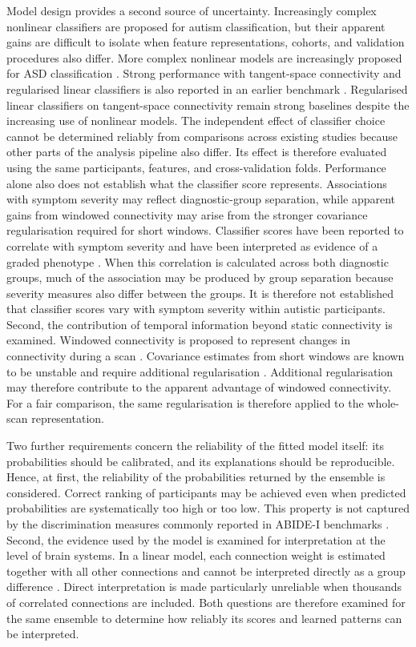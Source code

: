 Model design provides a second source of uncertainty. Increasingly complex nonlinear classifiers are proposed for autism classification, but their apparent gains are difficult to isolate when feature representations, cohorts, and validation procedures also differ. More complex nonlinear models are increasingly proposed for ASD classification \citep{Liuetal2024MADE,Tangetal2025GNNLSTM,Tangetal2026CASGNN}. Strong performance with tangent-space connectivity and regularised linear classifiers is also reported in an earlier benchmark \citep{Dadietal2019}. Regularised linear classifiers on tangent-space connectivity remain strong baselines despite the increasing use of nonlinear models. The independent effect of classifier choice cannot be determined reliably from comparisons across existing studies because other parts of the analysis pipeline also differ. Its effect is therefore evaluated using the same participants, features, and cross-validation folds. Performance alone also does not establish what the classifier score represents. Associations with symptom severity may reflect diagnostic-group separation, while apparent gains from windowed connectivity may arise from the stronger covariance regularisation required for short windows. Classifier scores have been reported to correlate with symptom severity and have been interpreted as evidence of a graded phenotype \citep{Nielsenetal2013}. When this correlation is calculated across both diagnostic groups, much of the association may be produced by group separation because severity measures also differ between the groups. It is therefore not established that classifier scores vary with symptom severity within autistic participants. Second, the contribution of temporal information beyond static connectivity is examined. Windowed connectivity is proposed to represent changes in connectivity during a scan \citep{Hutchisonetal2013,Allenetal2014,Pretietal2017}. Covariance estimates from short windows are known to be unstable and require additional regularisation \citep{LeonardiVanDeVille2015}. Additional regularisation may therefore contribute to the apparent advantage of windowed connectivity. For a fair comparison, the same regularisation is therefore applied to the whole-scan representation.

Two further requirements concern the reliability of the fitted model itself: its probabilities should be calibrated, and its explanations should be reproducible. Hence, at first, the reliability of the probabilities returned by the ensemble is considered. Correct ranking of participants may be achieved even when predicted probabilities are systematically too high or too low. This property is not captured by the discrimination measures commonly reported in ABIDE-I benchmarks \citep{Guoetal2017,VanCalsteretal2019}. Second, the evidence used by the model is examined for interpretation at the level of brain systems. In a linear model, each connection weight is estimated together with all other connections and cannot be interpreted directly as a group difference \citep{Haufeetal2014}. Direct interpretation is made particularly unreliable when thousands of correlated connections are included. Both questions are therefore examined for the same ensemble to determine how reliably its scores and learned patterns can be interpreted.


